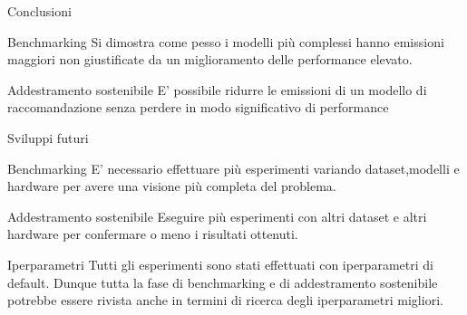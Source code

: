 \begin{frame}{Conclusioni}
    \begin{block}{Benchmarking}
        Si dimostra come pesso i modelli più complessi hanno emissioni maggiori non giustificate da un miglioramento delle performance elevato.
    \end{block}
    \begin{block}{Addestramento sostenibile}
        E' possibile ridurre le emissioni di un modello di raccomandazione senza perdere in modo significativo di performance
    \end{block}
\end{frame}



\begin{frame}{Sviluppi futuri}
    \scriptsize
    \begin{block}{Benchmarking}
        E’ necessario effettuare più esperimenti variando dataset,modelli e hardware per avere una visione più completa del problema.
    \end{block}
    \begin{block}{Addestramento sostenibile}
        Eseguire più esperimenti con altri dataset e altri hardware per confermare o meno i risultati ottenuti.
    \end{block}
    \begin{block}{Iperparametri}
        Tutti gli esperimenti sono stati effettuati con iperparametri di default. Dunque tutta la fase di benchmarking e di addestramento sostenibile potrebbe essere rivista anche in termini di ricerca degli iperparametri migliori.
    \end{block}
\end{frame}
